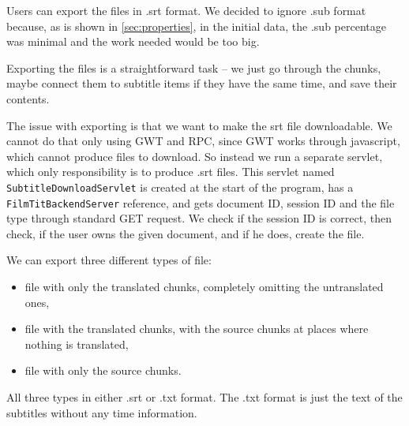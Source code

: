 Users can export the files in .srt format. We decided to ignore .sub format because, as is shown in \ref{sec:properties}, in the initial data, the .sub percentage was minimal and the work needed would be too big.

Exporting the files is a straightforward task -- we just go through the chunks, maybe connect them to subtitle items if they have the same time, and save their contents.



The issue with exporting is that we want to make the srt file downloadable. We cannot do that only using GWT and RPC, since GWT works through javascript, which cannot produce files to download. So instead we run a separate servlet, which only responsibility is to produce .srt files. This servlet named \texttt{SubtitleDownloadServlet} is created at the start of the program, has a \texttt{FilmTitBackendServer} reference, and gets document ID, session ID and the file type through standard GET request. We check if the session ID is correct, then check, if the user owns the given document, and if he does, create the file.

We can export three different types of file:
\begin{itemize}
    \item file with only the translated chunks, completely omitting the untranslated ones,
    \item file with the translated chunks, with the source chunks at places where nothing is translated,
    \item file with only the source chunks.
\end{itemize}
All three types in either .srt or .txt format. The .txt format is just the text of the subtitles without any time information.